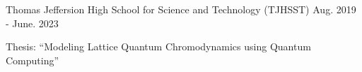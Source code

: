 \begin{cventries}
  \cventry
  {} %
  {Thomas Jeffersion High School for Science and Technology (TJHSST)} %
  {} %
  {Aug. 2019 - June. 2023} %
  {
    \begin{cvitems} %
      \item {Thesis: ``Modeling Lattice Quantum Chromodynamics using Quantum Computing''}
    \end{cvitems}
  }

\end{cventries}
